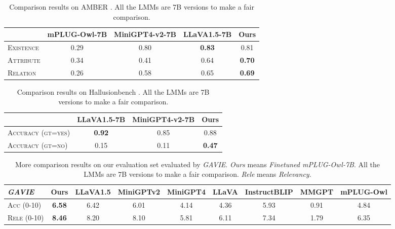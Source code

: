 \begin{table}[t]
\setlength\tabcolsep{3pt}
\centering
\small
\begin{tabular}{lcccc}
\toprule[1.5pt]
& mPLUG-Owl-7B & MiniGPT4-v2-7B & LLaVA1.5-7B & \textbf{Ours}\\
\midrule
\textsc{Existence} & 0.29 & 0.80 & \textbf{0.83} & 0.81\\
\textsc{Attribute}& 0.34 & 0.41 & 0.64 & \textbf{0.70}\\
\textsc{Relation} & 0.26 & 0.58 & 0.65 & \textbf{0.69}\\
\bottomrule[1.5pt]
\end{tabular}
\caption{
Comparison results on AMBER \citep{wang2023llm}. All the LMMs are 7B versions to make a fair comparison. 
}
\label{tab:comparison_amber}
\end{table}


\begin{table}[t]
\setlength\tabcolsep{3pt}
\centering
\small
\begin{tabular}{lccc}
\toprule[1.5pt]
& LLaVA1.5-7B & MiniGPT4-v2-7B & \textbf{Ours}\\
\midrule
\textsc{Accuracy (gt=yes)} & \textbf{0.92} & 0.85 & 0.88\\
\textsc{Accuracy (gt=no)} & 0.15 & 0.11 & \textbf{0.47}\\
\bottomrule[1.5pt]
\end{tabular}
\caption{
Comparison results on Hallusionbench \citep{liu2023hallusionbench}. All the LMMs are 7B versions to make a fair comparison. 
}
\label{tab:comparison_hallusion}
\end{table}

\begin{table}[t]
\setlength\tabcolsep{3pt}
\centering
\small
\begin{tabular}{lcccccccc}
\toprule[1.5pt]
\textit{GAVIE}& \textbf{Ours} & LLaVA1.5&MiniGPTv2&MiniGPT4 & LLaVA & InstructBLIP & MMGPT &mPLUG-Owl\\
\midrule
\textsc{Acc (0-10)} & \textbf{6.58} & 6.42& 6.01&4.14 & 4.36 & 5.93 & 0.91 & 4.84\\
\textsc{Rele (0-10)} & \textbf{8.46} & 8.20&8.10&5.81 & 6.11 & 7.34 & 1.79& 6.35\\
\bottomrule[1.5pt]
\end{tabular}
\vspace{-2mm}
\caption{
More comparison results on our evaluation set evaluated by \textit{GAVIE}. \textit{Ours} means \textit{Finetuned mPLUG-Owl-7B}. All the LMMs are 7B versions to make a fair comparison. \textit{Rele} means \textit{Relevancy}.
}
\label{tab:LRV_evaluation_more}
\end{table}

